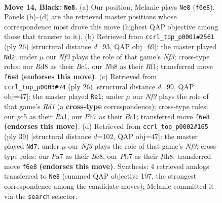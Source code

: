 \documentclass[11pt]{article}
\begin{document}
\clearpage

\begin{figure}[p]\centering
\begin{subfigure}{0.46\textwidth}\centering
\resizebox{\linewidth}{!}{%
\newchessgame
\chessboard[
  setfen={rn1r2k1/ppp2pbp/4bnp1/PPP1p3/4P2P/2N2N2/4BPP1/R1B1K2R b KQ - 0 14},
  showmover=false,
  pgfstyle=straightmove, color=movearrow, markmove={f6-e8}
]}
\caption{}
\end{subfigure}\hfill
\begin{subfigure}{0.46\textwidth}\centering
\resizebox{\linewidth}{!}{%
\newchessgame
\chessboard[
  setfen={r1bk3r/1pp3p1/p1n2p2/b3pn1p/N1P5/1P2PNPP/P4PB1/R1B2RK1 w - - 0 14},
  showmover=false,
  pgfstyle=straightmove, color=movearrow, markmove={f3-d2}
]}
\caption{}
\end{subfigure}
\\[4pt]
\begin{subfigure}{0.46\textwidth}\centering
\resizebox{\linewidth}{!}{%
\newchessgame
\chessboard[
  setfen={r3kb1r/1ppb1ppp/p1p3n1/P3P3/8/2N2N1P/1PP2PP1/R1BR2K1 w - - 1 14},
  showmover=false,
  pgfstyle=straightmove, color=movearrow, markmove={d1-e1}
]}
\caption{}
\end{subfigure}\hfill
\begin{subfigure}{0.46\textwidth}\centering
\resizebox{\linewidth}{!}{%
\newchessgame
\chessboard[
  setfen={r1b4r/1p2kpp1/2p1nn2/4p2p/p1P1P2P/P1N1BPP1/1P2B3/3RK2R b K - 2 20},
  showmover=false,
  pgfstyle=straightmove, color=movearrow, markmove={f6-d7}
]}
\caption{}
\end{subfigure}
\caption{\textbf{Move 14, Black: \texttt{Ne8}.} (a) Our position; Melanie plays \texttt{Ne8} (\texttt{f6e8}). Panels (b)--(d) are the retrieved master positions whose correspondence most drove this move (highest QAP objective among those that transfer to it). (b) Retrieved from \texttt{ccrl\_top\_p0001\#2561} (ply 26) [structural distance $d$=93, QAP obj=69]: the master played \texttt{Nd2}; under $\mu$ our \emph{Nf3} plays the role of that game's \emph{Nf3}; cross-type roles: our \emph{R}d8 as their \emph{B}c1, our \emph{N}b8 as their \emph{R}f1; transferred move \texttt{f6e8} \textbf{(endorses this move)}. (c) Retrieved from \texttt{ccrl\_top\_p0003\#74} (ply 26) [structural distance $d$=99, QAP obj=47]: the master played \texttt{Re1}; under $\mu$ our \emph{Nf3} plays the role of that game's \emph{Rd1} (a \textbf{cross-type} correspondence); cross-type roles: our \emph{p}c5 as their \emph{R}a1, our \emph{P}h7 as their \emph{B}c1; transferred move \texttt{f6e8} \textbf{(endorses this move)}. (d) Retrieved from \texttt{ccrl\_top\_p0002\#165} (ply 39) [structural distance $d$=102, QAP obj=47]: the master played \texttt{Nd7}; under $\mu$ our \emph{Nf3} plays the role of that game's \emph{Nf3}; cross-type roles: our \emph{P}a7 as their \emph{B}c8, our \emph{P}b7 as their \emph{R}h8; transferred move \texttt{f6e8} \textbf{(endorses this move)}. Synthesis: 4 retrieved analogs transferred to \texttt{Ne8} (summed QAP objective 197, the strongest correspondence among the candidate moves); Melanie committed it via the \texttt{search} selector.}
\label{fig:thought-m27}
\end{figure}
\end{document}
